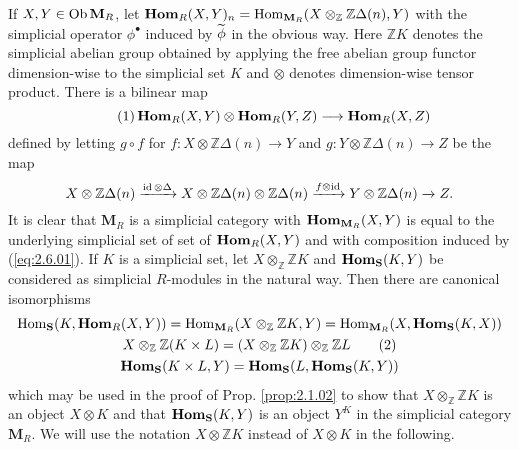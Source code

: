 \documentclass[../main]{subfiles}
\begin{document}
If $X,Y\in\operatorname{Ob}\mathbf{M}_R$, let $\operatorname{\mathbf{Hom}}_R(X,Y)_n=\operatorname{Hom}_{\mathbf{M}_R}(X\otimes_{\mathbb{Z}}\mathbb{Z}\Delta(n),Y)$ with the simplicial operator $\phi^\bullet $ induced by $\xtilde{\phi}$ in the obvious way. Here $\mathbb{Z}K$ denotes the simplicial abelian group obtained by applying the free abelian group functor dimension-wise to the simplicial set $K$ and $\otimes$ denotes dimension-wise tensor product. There is a bilinear map
\begin{equation}\tag{1}\label{eq:2.6.01}
    \operatorname{\mathbf{Hom}}_{R}(X,Y)\otimes\operatorname{\mathbf{Hom}}_R(Y,Z)\longrightarrow\operatorname{\mathbf{Hom}}_R(X,Z)
\end{equation}
defined by letting $g\circ f$ for $f:X\otimes\mathbb{Z}\Delta(n)\longrightarrow Y$ and $g:Y\otimes\mathbb{Z}\Delta(n)\longrightarrow Z$ be the map
\begin{equation*}  
X\otimes\mathbb{Z}\Delta(n)\xrightarrow{\operatorname{id} \otimes\Delta}X\otimes\mathbb{Z}\Delta(n)\otimes\mathbb{Z}\Delta(n)\xrightarrow{f\otimes\operatorname{id} }Y\otimes\mathbb{Z}\Delta(n)\xrightarrow[]{}Z.
\end{equation*}
It is clear that $\mathbf{M}_R$ is a simplicial category with $\operatorname{\mathbf{Hom}}_{\mathbf{M}_R}(X,Y)$ %
is equal to the underlying simplicial set of set of $\operatorname{\mathbf{Hom}}_R(X,Y)$ and with composition induced by (\ref{eq:2.6.01}). If $K$ is a simplicial set, let $X\otimes_{\mathbb{Z}}\mathbb{Z}K$ and $\operatorname{\mathbf{Hom}}_{\mathbf{S}}(K,Y)$ be considered as simplicial $R$-modules in the natural way. Then there are canonical isomorphisms
\begin{gather*}
\operatorname{Hom}_{\mathbf{S}}(K,\operatorname{\mathbf{Hom}}_R(X,Y))=\operatorname{Hom}_{\mathbf{M}_R}(X\otimes_{\mathbb{Z}}\mathbb{Z}K,Y)=\operatorname{Hom}_{\mathbf{M}_R}(X,\operatorname{\mathbf{Hom}}_{\mathbf{S}}(K,X))\nonumber\\
X\otimes_{\mathbb{Z}}\mathbb{Z}(K\times L)=(X\otimes_{\mathbb{Z}}\mathbb{Z}K)\otimes_{\mathbb{Z}}\mathbb{Z}L\label{eq:2.6.02}\tag{2}\\
\operatorname{\mathbf{Hom}}_{\mathbf{S}}(K\times L,Y)=\operatorname{\mathbf{Hom}}_{\mathbf{S}}(L,\operatorname{\mathbf{Hom}}_{\mathbf{S}}(K,Y))\nonumber
\end{gather*}
which may be used in the proof of Prop. \ref{prop:2.1.02} to show that $X\otimes_{\mathbb{Z}}\mathbb{Z}K$ is an object $X\otimes K$ and that $\operatorname{\mathbf{Hom}}_{\mathbf{S}}(K,Y)$ is an object $Y^K$ in the simplicial category $\mathbf{M}_R$. We will use the notation $X\otimes\mathbb{Z}K$ instead of $X\otimes K$ in the following.
\end{document}
